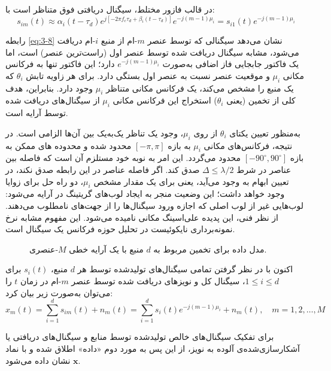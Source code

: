 در قالب فازور مختلط، سیگنال دریافتی فوق متناظر است با:
\begin{equation}
	s_{im}(t) \approx \alpha_i(t-\tau_d) e^{j[-2\pi f_c \tau_d + \beta_i(t-\tau_d)]} e^{-j(m-1)\mu_i} = s_{i1}(t) e^{-j(m-1)\mu_i}
	\label{eq:3-8}
\end{equation}

رابطه \eqref{eq:3-8} نشان می‌دهد سیگنالی که توسط عنصر $m$-ام از منبع $i$-ام دریافت می‌شود، مشابه سیگنال دریافت شده توسط عنصر اول (راست‌ترین عنصر) است، اما یک فاکتور جابجایی فاز اضافی به‌صورت $e^{-j(m-1)\mu_i}$ دارد؛ این فاکتور تنها به فرکانس مکانی $\mu_i$ و موقعیت عنصر نسبت به عنصر اول بستگی دارد. برای هر زاویه تابش $\theta_i$ که یک منبع را مشخص می‌کند، یک فرکانس مکانی متناظر $\mu_i$ وجود دارد. بنابراین، هدف کلی از تخمین  (یعنی $\theta_i$) استخراج این فرکانس مکانی $\mu_i$ از سیگنال‌های دریافت شده توسط آرایه است.

به‌منظور تعیین یکتای $\theta_i$ از روی $\mu_i$، وجود یک تناظر یک‌به‌یک بین آن‌ها الزامی است. در نتیجه، فرکانس‌های مکانی $\mu_i$ به بازه $[-\pi, \pi]$ محدود شده و محدوده های ممکن به بازه $[-90^\circ, 90^\circ]$ محدود می‌گردد. این امر به نوبه خود مستلزم آن است که فاصله بین عناصر در شرط $\Delta \leq \lambda/2$ صدق کند. اگر فاصله عناصر در این رابطه صدق نکند، در تعیین  ابهام به وجود می‌آید، یعنی برای یک مقدار مشخص $\mu_i$، دو راه حل برای زوایا وجود خواهد داشت؛ این وضعیت منجر به ایجاد لوب‌های گریتینگ در آرایه می‌شود: لوب‌هایی غیر از لوب اصلی که اجازه ورود سیگنال‌ها را از جهت‌های نامطلوب می‌دهند. از نظر فنی، این پدیده علی‌اسینگ مکانی نامیده می‌شود. این مفهوم مشابه نرخ نمونه‌برداری نایکوئیست در تحلیل حوزه فرکانس یک سیگنال است.



\begin{figure}[ht]
	\centering
	\caption{مدل داده برای تخمین  مربوط به $d$ منبع با یک آرایه خطی $M$-عنصری.}
	\label{fig:3-2}
\end{figure}

اکنون با در نظر گرفتن تمامی سیگنال‌های تولیدشده توسط هر $d$ منبع، $s_i(t)$ برای $1 \le i \le d$، سیگنال کل و نویزهای دریافت شده توسط عنصر $m$-ام در زمان $t$ را می‌توان به‌صورت زیر بیان کرد:
\begin{equation}
	x_m(t) = \sum_{i=1}^{d} s_{im}(t) + n_m(t) = \sum_{i=1}^{d} s_i(t) e^{-j(m-1)\mu_i} + n_m(t), \quad m = 1, 2, \dots, M
	\label{eq:3-9}
\end{equation}


برای تفکیک سیگنال‌های خالص تولیدشده توسط منابع و سیگنال‌های دریافتی یا آشکارسازی‌شده‌ی آلوده به نویز، از این پس به مورد دوم «داده» اطلاق شده و با نماد $\bm{x}$ نشان داده می‌شود.

